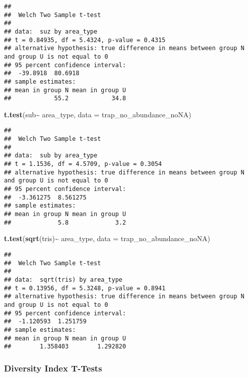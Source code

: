 \documentclass[
]{article}
\newenvironment{Shaded}{\begin{snugshade}}{\end{snugshade}}
\newcommand{\AttributeTok}[1]{\textcolor[rgb]{0.13,0.29,0.53}{#1}}
\newcommand{\FunctionTok}[1]{\textcolor[rgb]{0.13,0.29,0.53}{\textbf{#1}}}
\newcommand{\NormalTok}[1]{#1}
\newcommand{\SpecialCharTok}[1]{\textcolor[rgb]{0.81,0.36,0.00}{\textbf{#1}}}
\begin{document}
\begin{verbatim}
## 
##  Welch Two Sample t-test
## 
## data:  suz by area_type
## t = 0.84935, df = 5.4324, p-value = 0.4315
## alternative hypothesis: true difference in means between group N and group U is not equal to 0
## 95 percent confidence interval:
##  -39.8918  80.6918
## sample estimates:
## mean in group N mean in group U 
##            55.2            34.8
\end{verbatim}

\begin{Shaded}
\begin{Highlighting}[]
\FunctionTok{t.test}\NormalTok{(sub}\SpecialCharTok{\textasciitilde{}}\NormalTok{ area\_type, }\AttributeTok{data =}\NormalTok{ trap\_no\_abundance\_noNA)}
\end{Highlighting}
\end{Shaded}

\begin{verbatim}
## 
##  Welch Two Sample t-test
## 
## data:  sub by area_type
## t = 1.1536, df = 4.5709, p-value = 0.3054
## alternative hypothesis: true difference in means between group N and group U is not equal to 0
## 95 percent confidence interval:
##  -3.361275  8.561275
## sample estimates:
## mean in group N mean in group U 
##             5.8             3.2
\end{verbatim}

\begin{Shaded}
\begin{Highlighting}[]
\FunctionTok{t.test}\NormalTok{(}\FunctionTok{sqrt}\NormalTok{(tris)}\SpecialCharTok{\textasciitilde{}}\NormalTok{ area\_type, }\AttributeTok{data =}\NormalTok{ trap\_no\_abundance\_noNA)}
\end{Highlighting}
\end{Shaded}

\begin{verbatim}
## 
##  Welch Two Sample t-test
## 
## data:  sqrt(tris) by area_type
## t = 0.13956, df = 5.3248, p-value = 0.8941
## alternative hypothesis: true difference in means between group N and group U is not equal to 0
## 95 percent confidence interval:
##  -1.120593  1.251759
## sample estimates:
## mean in group N mean in group U 
##        1.358403        1.292820
\end{verbatim}

\hypertarget{diversity-index-t-tests}{%
\subsubsection{Diversity Index T-Tests}\label{diversity-index-t-tests}}
\end{document}
